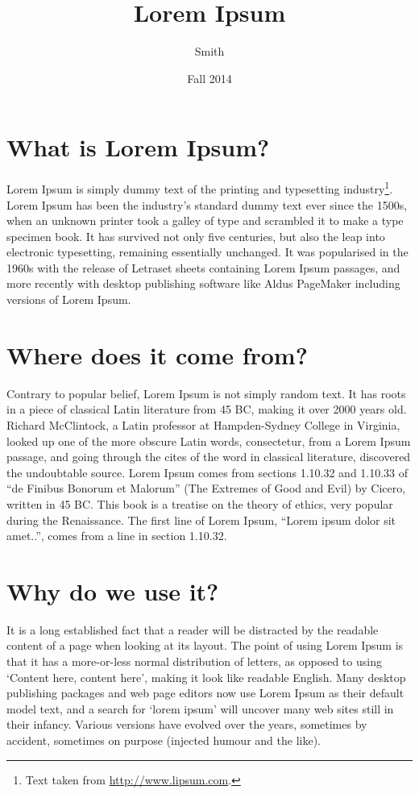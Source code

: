 \documentclass{wit_handout}
\title{Lorem Ipsum}
\author{Smith}
\date{Fall 2014}
\begin{document}
\maketitle

\section*{What is Lorem Ipsum?}
Lorem Ipsum is simply dummy text of the printing and typesetting industry\footnote{Text taken from \url{http://www.lipsum.com}.}.
Lorem Ipsum has been the industry's standard dummy text ever since the 1500s, when an unknown printer took a galley of type and scrambled it to make a type specimen book. 
It has survived not only five centuries, but also the leap into electronic typesetting, remaining essentially unchanged. 
It was popularised in the 1960s with the release of Letraset sheets containing Lorem Ipsum passages, and more recently with desktop publishing software like Aldus PageMaker including versions of Lorem Ipsum.

\section*{Where does it come from?}
Contrary to popular belief, Lorem Ipsum is not simply random text. 
It has roots in a piece of classical Latin literature from 45 BC, making it over 2000 years old. 
Richard McClintock, a Latin professor at Hampden-Sydney College in Virginia, looked up one of the more obscure Latin words, consectetur, from a Lorem Ipsum passage, and going through the cites of the word in classical literature, discovered the undoubtable source. 
Lorem Ipsum comes from sections 1.10.32 and 1.10.33 of ``de Finibus Bonorum et Malorum'' (The Extremes of Good and Evil) by Cicero, written in 45 BC. 
This book is a treatise on the theory of ethics, very popular during the Renaissance. 
The first line of Lorem Ipsum, ``Lorem ipsum dolor sit amet..'', comes from a line in section 1.10.32.

\section*{Why do we use it?}
It is a long established fact that a reader will be distracted by the readable content of a page when looking at its layout. 
The point of using Lorem Ipsum is that it has a more-or-less normal distribution of letters, as opposed to using `Content here, content here', making it look like readable English. 
Many desktop publishing packages and web page editors now use Lorem Ipsum as their default model text, and a search for `lorem ipsum' will uncover many web sites still in their infancy. 
Various versions have evolved over the years, sometimes by accident, sometimes on purpose (injected humour and the like).
\end{document}
